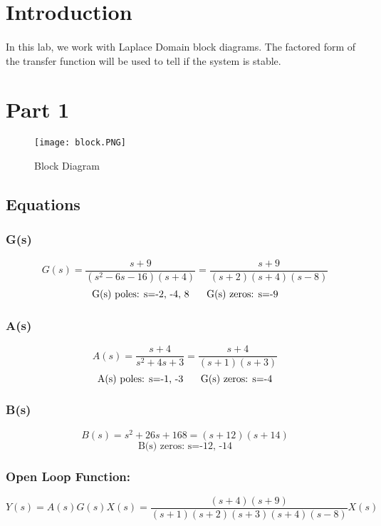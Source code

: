 \tableofcontents

\newpage
\section{Introduction}

\paragraph{}
In this lab, we work with Laplace Domain block diagrams.  The factored form of the transfer function will be used to tell if the system is stable.

\section{Part 1}

 \begin{figure}[H]
   \centering
   \texttt{[image: block.PNG]}
   \caption{Block Diagram}
 \end{figure}

\subsection{Equations}

\subsubsection{G(s)}
\[G(s)=\dfrac{s+9}{(s^{2}-6s-16)(s+4)}=\dfrac{s+9}{(s+2)(s+4)(s-8)}\]
\[\text{G(s) poles: s=-2, -4, 8 \hspace{.5cm}G(s) zeros: s=-9}\]
\subsubsection{A(s)}
\[A(s)=\dfrac{s+4}{s^{2}+4s+3}=\dfrac{s+4}{(s+1)(s+3)}\]
\[\text{A(s) poles: s=-1, -3 \hspace{.5cm}G(s) zeros: s=-4}\]
\subsubsection{B(s)}
\[B(s)=s^{2}+26s+168=(s+12)(s+14)\]
\[\text{B(s) zeros: s=-12, -14}\]

\subsubsection{Open Loop Function: }
\[Y(s) = A(s)G(s)X(s)=\frac{(s+4)(s+9)}{(s+1)(s+2)(s+3)(s+4)(s-8)}X(s)\]
